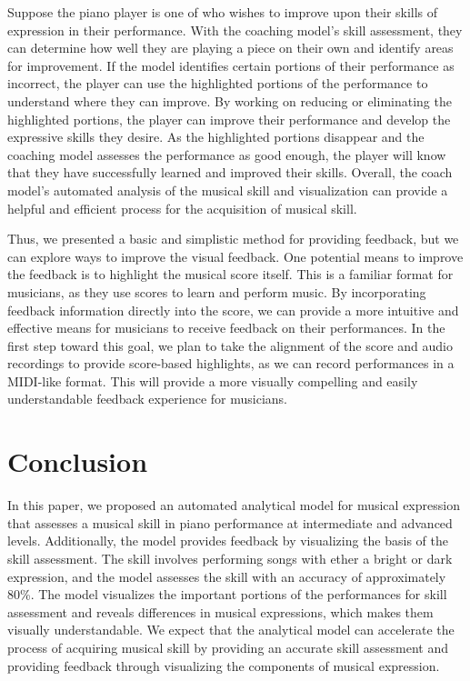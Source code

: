 \documentclass[manuscript,review,anonymous]{acmart}
\begin{document}
Suppose the piano player is one of who wishes to improve upon their skills of expression in their performance. 
With the coaching model's skill assessment, they can determine how well they are playing a piece on their own and identify areas for improvement. 
If the model identifies certain portions of their performance as incorrect, the player can use the highlighted portions of the performance to understand where they can improve. 
By working on reducing or eliminating the highlighted portions, the player can improve their performance and develop the expressive skills they desire. 
As the highlighted portions disappear and the coaching model assesses the performance as good enough, the player will know that they have successfully learned and improved their skills. 
Overall, the coach model's automated analysis of the musical skill and visualization can provide a helpful and efficient process for the acquisition of musical skill.

Thus, we presented a basic and simplistic method for providing feedback, but we can explore ways to improve the visual feedback.
One potential means to improve the feedback is to highlight the musical score itself. 
This is a familiar format for musicians, as they use scores to learn and perform music. 
By incorporating feedback information directly into the score, we can provide a more intuitive and effective means for musicians to receive feedback on their performances. 
In the first step toward this goal, we plan to take the alignment of the score and audio recordings to provide score-based highlights, as we can record performances in a MIDI-like format.
This will provide a more visually compelling and easily understandable feedback experience for musicians.


\section{Conclusion}
In this paper, we proposed an automated analytical model for musical expression that assesses a musical skill in piano performance at intermediate and advanced levels.
Additionally, the model provides feedback by visualizing the basis of the skill assessment.
The skill involves performing songs with ether a bright or dark expression, and the model assesses the skill with an accuracy of approximately 80\%.
The model visualizes the important portions of the performances for skill assessment and reveals differences in musical expressions, which makes them visually understandable. We expect that the analytical model can accelerate the process of acquiring musical skill by providing an accurate skill assessment and providing feedback through visualizing the components of musical expression.
\end{document}
